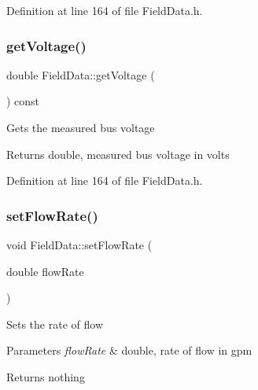 Definition at line 164 of file Field\+Data.\+h.

\mbox{\label{class_field_data_a1e8a55965e6cbd8c7b49c0dd5fbee002}} 
\subsubsection{\texorpdfstring{get\+Voltage()}{getVoltage()}\hspace{0.1cm}{\footnotesize\ttfamily [3/3]}}
{\footnotesize\ttfamily double Field\+Data\+::get\+Voltage (\begin{DoxyParamCaption}{ }\end{DoxyParamCaption}) const\hspace{0.3cm}{\ttfamily [inline]}}

Gets the measured bus voltage

\begin{DoxyReturn}{Returns}
double, measured bus voltage in volts 
\end{DoxyReturn}


Definition at line 164 of file Field\+Data.\+h.

\mbox{\label{class_field_data_ad25c3e5a76b4e493e82d3f70cc3c0ed9}} 
\subsubsection{\texorpdfstring{set\+Flow\+Rate()}{setFlowRate()}\hspace{0.1cm}{\footnotesize\ttfamily [1/3]}}
{\footnotesize\ttfamily void Field\+Data\+::set\+Flow\+Rate (\begin{DoxyParamCaption}\item[{double}]{flow\+Rate }\end{DoxyParamCaption})\hspace{0.3cm}{\ttfamily [inline]}}

Sets the rate of flow


\begin{DoxyParams}{Parameters}
{\em flow\+Rate} & double, rate of flow in gpm\\
\hline
\end{DoxyParams}
\begin{DoxyReturn}{Returns}
nothing 
\end{DoxyReturn}


